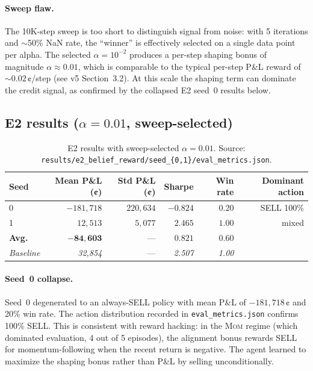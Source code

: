 \documentclass[11pt]{article}
\begin{document}
\paragraph{Sweep flaw.}
The 10K-step sweep is too short to distinguish signal from noise: with 5
iterations and $\sim$50\% NaN rate, the ``winner'' is effectively selected
on a single data point per alpha. The selected $\alpha=10^{-2}$ produces a
per-step shaping bonus of magnitude $\alpha \approx 0.01$, which is
comparable to the typical per-step P\&L reward of $\sim 0.02$\,¢/step
(see v5 Section~3.2). At this scale the shaping term can dominate the
credit signal, as confirmed by the collapsed E2 seed~0 results below.

\subsection{E2 results ($\alpha = 0.01$, sweep-selected)}

\begin{table}[H]
\centering
\begin{tabular}{lrrrrr}
\toprule
\textbf{Seed} &
\textbf{Mean P\&L (¢)} &
\textbf{Std P\&L (¢)} &
\textbf{Sharpe} &
\textbf{Win rate} &
\textbf{Dominant action} \\
\midrule
0 & $-181{,}718$ & $220{,}634$ & $-0.824$ & $0.20$ & SELL 100\% \\
1 & $\phantom{-0}12{,}513$ & $\phantom{00}5{,}077$ & $2.465$ & $1.00$ & mixed \\
\midrule
\textbf{Avg.} & $\mathbf{-84{,}603}$ & --- & $\mathbf{0.821}$ & $\mathbf{0.60}$ & \\
\midrule
\textit{Baseline} & \textit{32,854} & --- & \textit{2.507} & \textit{1.00} & \\
\bottomrule
\end{tabular}
\caption{E2 results with sweep-selected $\alpha=0.01$.
         Source: \texttt{results/e2\_belief\_reward/seed\_\{0,1\}/eval\_metrics.json}.}
\label{tab:e2a01}
\end{table}

\paragraph{Seed~0 collapse.}
Seed~0 degenerated to an always-SELL policy with mean P\&L of
$-181{,}718$\,¢ and 20\% win rate. The action distribution recorded in
\texttt{eval\_metrics.json} confirms 100\% SELL.
This is consistent with reward hacking: in the \textsc{Mom} regime
(which dominated evaluation, 4 out of 5 episodes), the alignment bonus
rewards SELL for momentum-following when the recent return is negative.
The agent learned to maximize the shaping bonus rather than P\&L by selling
unconditionally.
\end{document}
